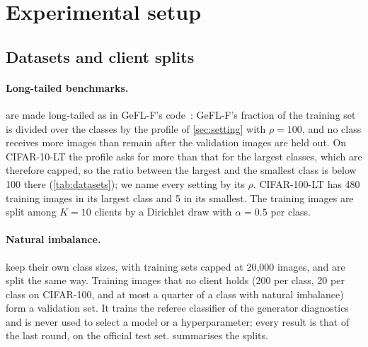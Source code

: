 \section{Experimental setup}\label{sec:setup}

\subsection{Datasets and client splits}\label{sec:setup-data}

\paragraph{Long-tailed benchmarks.}  are made long-tailed as in GeFL-F's
code~\cite{kang2025gefl}: GeFL-F's fraction of the training set is divided over the classes by the profile of
\cref{sec:setting} with $\rho=100$, and no class receives more images than remain after the validation images are
held out. On CIFAR-10-LT the profile asks for more than that for the largest classes, which are therefore capped, so
the ratio between the largest and the smallest class is below 100 there (\cref{tab:datasets}); we name every setting
by its $\rho$. CIFAR-100-LT has 480 training images in its largest class and 5 in its smallest. The training images
are split among $K=10$ clients by a Dirichlet draw with $\alpha=0.5$ per class.
\paragraph{Natural imbalance.}  keep their own class sizes, with training sets capped at 20,000
images, and are split the same way. Training images that no client holds (200 per class, 20 per class on CIFAR-100,
and at most a quarter of a class with natural imbalance) form a validation set. It trains the referee classifier of the
generator diagnostics and is never used to select a model or a hyperparameter: every result is that of the last round,
on the official test set.  summarises the splits.

\begin{table}[t]
\centering\small
\caption{Datasets as used: classes, training images held by the clients, test images, and the ratio between the
largest and the smallest class in the federation (natural imbalance: the dataset's own class sizes).}
\label{tab:datasets}
\end{table}

